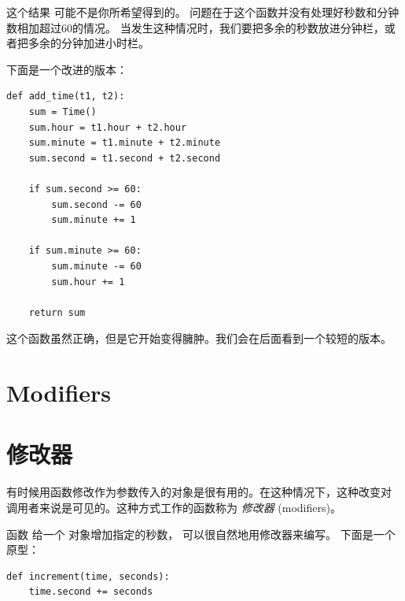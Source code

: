 {%

这个结果  可能不是你所希望得到的。
问题在于这个函数并没有处理好秒数和分钟数相加超过60的情况。
当发生这种情况时，我们要把多余的秒数放进分钟栏，或者把多余的分钟加进小时栏。

下面是一个改进的版本：

\begin{lstlisting}
def add_time(t1, t2):
    sum = Time()
    sum.hour = t1.hour + t2.hour
    sum.minute = t1.minute + t2.minute
    sum.second = t1.second + t2.second

    if sum.second >= 60:
        sum.second -= 60
        sum.minute += 1

    if sum.minute >= 60:
        sum.minute -= 60
        sum.hour += 1

    return sum
\end{lstlisting}


这个函数虽然正确，但是它开始变得臃肿。我们会在后面看到一个较短的版本。

\section{Modifiers}
\section{修改器}

\label{increment}
  


有时候用函数修改作为参数传入的对象是很有用的。在这种情况下，这种改变对
调用者来说是可见的。这种方式工作的函数称为 {\em 修改器} (modifiers)。



函数  给一个  对象增加指定的秒数，
可以很自然地用修改器来编写。  下面是一个原型：

\begin{lstlisting}
def increment(time, seconds):
    time.second += seconds


\end{lstlisting}}

